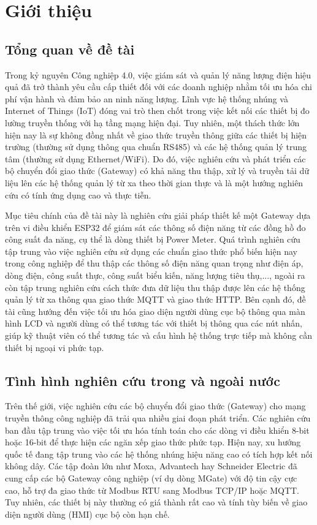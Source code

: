 \chapter{Giới thiệu}
\section{Tổng quan về đề tài}
Trong kỷ nguyên Công nghiệp 4.0, việc giám sát và quản lý năng lượng điện hiệu quả đã trở thành yêu cầu cấp thiết đối với 
các doanh nghiệp nhằm tối ưu hóa chi phí vận hành và đảm bảo an ninh năng lượng. Lĩnh vực hệ thống nhúng và Internet of Things (IoT) 
đóng vai trò then chốt trong việc kết nối các thiết bị đo lường truyền thống với hạ tầng mạng hiện đại. Tuy nhiên, một thách thức 
lớn hiện nay là sự không đồng nhất về giao thức truyền thông giữa các thiết bị hiện trường (thường sử dụng thông qua chuẩn RS485) 
và các hệ thống quản lý trung tâm (thường sử dụng Ethernet/WiFi). Do đó, việc nghiên cứu và phát triển các bộ chuyển đổi giao thức (Gateway) 
có khả năng thu thập, xử lý và truyền tải dữ liệu lên các hệ thống quản lý từ xa theo thời gian thực và là một hướng nghiên cứu có tính ứng dụng cao và thực tiễn.

Mục tiêu chính của đề tài này là nghiên cứu giải pháp thiết kế một Gateway dựa trên vi điều khiển ESP32 để giám sát các
thông số điện năng từ các đồng hồ đo công suất đa năng, cụ thể là dòng thiết bị Power Meter. Quá trình nghiên cứu tập trung vào 
việc nghiên cứu sử dụng các chuẩn giao thức phổ biến hiện nay trong công nghiệp để thu thập các thông số điện năng quan trọng như điện áp, dòng điện, công suất thực, 
công suất biểu kiến, năng lượng tiêu thụ,..., ngoài ra còn tập trung nghiên cứu cách thức đưa dữ liệu thu thập được lên các hệ thống quản lý từ xa thông qua 
giao thức MQTT và giao thức HTTP. Bên cạnh đó, đề tài cũng hướng đến việc tối ưu hóa giao diện người dùng cục bộ thông qua màn hình LCD và người dùng có thể tương tác
với thiết bị thông qua các nút nhấn, giúp kỹ thuật viên có thể tương tác và cấu hình hệ thống trực tiếp mà không cần thiết bị ngoại vi phức tạp.
\section{Tình hình nghiên cứu trong và ngoài nước}
Trên thế giới, việc nghiên cứu các bộ chuyển đổi giao thức (Gateway) cho mạng truyền thông công nghiệp đã trải qua nhiều giai đoạn phát triển. 
Các nghiên cứu ban đầu tập trung vào việc tối ưu hóa tính toán cho các dòng vi điều khiển 8-bit hoặc 16-bit để thực hiện các ngăn xếp giao thức phức tạp.
 Hiện nay, xu hướng quốc tế đang tập trung vào các hệ thống nhúng hiệu năng cao có tích hợp kết nối không dây. Các tập đoàn lớn như Moxa, Advantech hay Schneider Electric
đã cung cấp các bộ Gateway công nghiệp (ví dụ dòng MGate) với độ tin cậy cực cao, hỗ trợ đa giao thức từ Modbus RTU sang Modbus TCP/IP hoặc MQTT. 
Tuy nhiên, các thiết bị này thường có giá thành rất cao và tính tùy biến về giao diện người dùng (HMI) cục bộ còn hạn chế.

